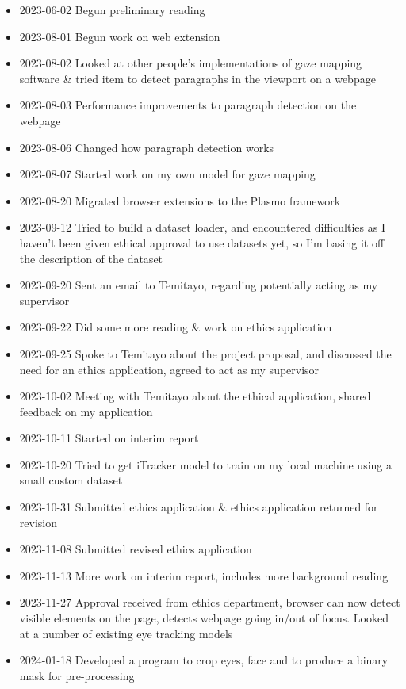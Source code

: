 \documentclass{report}
\begin{document}
\begin{itemize}
    \item 2023-06-02 Begun preliminary reading 
    \item 2023-08-01 Begun work on web extension 
    \item 2023-08-02 Looked at other people's implementations of gaze mapping software \& tried item to detect paragraphs in the viewport on a webpage 
    \item 2023-08-03 Performance improvements to paragraph detection on the webpage 
    \item 2023-08-06 Changed how paragraph detection works 
    \item 2023-08-07 Started work on my own model for gaze mapping 
    \item 2023-08-20 Migrated browser extensions to the Plasmo framework 
    \item 2023-09-12 Tried to build a dataset loader, and encountered difficulties as I haven't been given ethical approval to use datasets yet, so I'm basing it off the description of the dataset
    \item 2023-09-20 Sent an email to Temitayo, regarding potentially acting as my supervisor
    \item 2023-09-22 Did some more reading \& work on ethics application  
    \item 2023-09-25 Spoke to Temitayo about the project proposal, and discussed the need for an ethics application, agreed to act as my supervisor 
    \item 2023-10-02 Meeting with Temitayo about the ethical application, shared feedback on my application 
    \item 2023-10-11 Started on interim report 
    \item 2023-10-20 Tried to get iTracker model to train on my local machine using a small custom dataset 
    \item 2023-10-31 Submitted ethics application \& ethics application returned for revision
    \item 2023-11-08 Submitted revised ethics application 
    \item 2023-11-13 More work on interim report, includes more background reading 
    \item 2023-11-27 Approval received from ethics department, browser can now detect visible elements on the page, detects webpage going in/out of focus. Looked at a number of existing eye tracking models   
    \item 2024-01-18 Developed a program to crop eyes, face and to produce a binary mask for pre-processing 

\end{itemize}
\end{document}
